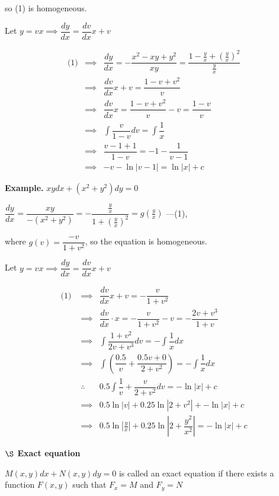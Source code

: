 so  (1) is homogeneous.

Let $y = vx \implies \dfrac{dy}{dx} = \dfrac{dv}{dx}x + v$

\begin{eqnarray*}
	\text{(1)} &\implies& \dfrac{dy}{dx} = -\dfrac{x^2 - xy + y^2}{xy} = \dfrac{1 - \frac{y}{x} + (\frac{y}{x})^2}{\frac{y}{x}}\\
	&\implies& \dfrac{dv}{dx}x + v = \dfrac{1 - v + v^2}{v}\\
	&\implies& \dfrac{dv}{dx}x = \dfrac{1 - v + v^2}{v} - v = \dfrac{1 - v}{v}\\
	&\implies&\int \dfrac{v}{1-v}dv = \int \dfrac{1}{x}\\
	&\implies& \dfrac{v-1+1}{1-v} = -1 - \dfrac{1}{v-1}\\
	&\implies& -v-\ln|v - 1| = \ln |x| + c
\end{eqnarray*}


\textbf{Example.} $xydx + (x^2 + y^2)dy = 0$

\begin{solution}
	$\dfrac{dy}{dx} = \dfrac{xy}{-(x^2 + y^2)} = -\dfrac{\frac{y}{x}}{1 + (\frac{y}{x})^2} = g(\frac{y}{x}) $ ---(1), 
	
	where $g(v) = \dfrac{-v}{1+v^2}$, so the equation is homogeneous.
	
	Let $y = vx \implies \dfrac{dy}{dx} = \dfrac{dv}{dx}x + v$
	
	\begin{eqnarray*}
		\text{(1) } &\implies& \dfrac{dv}{dx}x + v = -\dfrac{v}{1+v^2}\\
		&\implies& \dfrac{dv}{dx} \cdot x = -\dfrac{v}{1+v^2} - v = -\dfrac{2v + v^3}{1 + v}\\
		&\implies& \int \dfrac{1 + v^2}{2v + v^3}dv = -\int \dfrac{1}{x}dx\\
		&\implies& \int (\dfrac{0.5}{v} + \dfrac{0.5v + 0}{2 + v^2}) = - \int \dfrac{1}{x}dx\\
		&\therefore & 0.5 \int \dfrac{1}{v} + \dfrac{v}{2+v^2}dv = - \ln |x| + c\\
		&\implies& 0.5 \ln|v| + 0.25\ln |2 + v^2| + -\ln|x| + c\\
		&\implies& 0.5 \ln |\frac{y}{x}| + 0.25 \ln |2 + \dfrac{y^2}{x^2}| = -\ln |x| + c
	\end{eqnarray*}
\end{solution}

\textbf{$\S$ Exact equation}

\begin{defn}
	$M(x,y)dx + N(x,y)dy=0$ is called an exact equation if there exists a function $F(x,y)$ such that $F_x = M$ and $F_y = N$
\end{defn}


